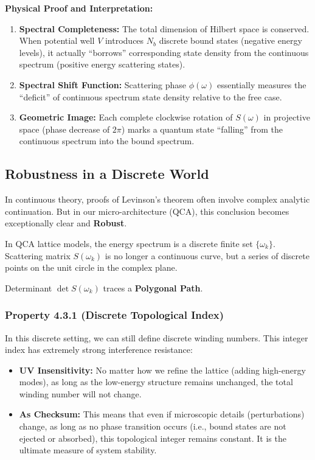 \documentclass[11pt,a4paper,twoside]{book}
\begin{document}
\textbf{Physical Proof and Interpretation:}

\begin{enumerate}
\item \textbf{Spectral Completeness:} The total dimension of Hilbert space is conserved. When potential well $V$ introduces $N_b$ discrete bound states (negative energy levels), it actually ``borrows'' corresponding state density from the continuous spectrum (positive energy scattering states).

\item \textbf{Spectral Shift Function:} Scattering phase $\phi(\omega)$ essentially measures the ``deficit'' of continuous spectrum state density relative to the free case.

\item \textbf{Geometric Image:} Each complete clockwise rotation of $S(\omega)$ in projective space (phase decrease of $2\pi$) marks a quantum state ``falling'' from the continuous spectrum into the bound spectrum.
\end{enumerate}

\subsection{Robustness in a Discrete World}

In continuous theory, proofs of Levinson's theorem often involve complex analytic continuation. But in our micro-architecture (QCA), this conclusion becomes exceptionally clear and \textbf{Robust}.

In QCA lattice models, the energy spectrum is a discrete finite set $\{\omega_k\}$. Scattering matrix $S(\omega_k)$ is no longer a continuous curve, but a series of discrete points on the unit circle in the complex plane.

Determinant $\det S(\omega_k)$ traces a \textbf{Polygonal Path}.

\subsubsection{Property 4.3.1 (Discrete Topological Index)}

In this discrete setting, we can still define discrete winding numbers. This integer index has extremely strong interference resistance:

\begin{itemize}
\item \textbf{UV Insensitivity:} No matter how we refine the lattice (adding high-energy modes), as long as the low-energy structure remains unchanged, the total winding number will not change.

\item \textbf{As Checksum:} This means that even if microscopic details (perturbations) change, as long as no phase transition occurs (i.e., bound states are not ejected or absorbed), this topological integer remains constant. It is the ultimate measure of system stability.
\end{itemize}
\end{document}
